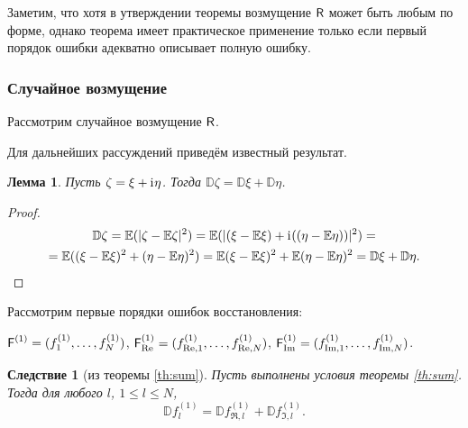 \documentclass[specialist,
               substylefile = spbu.rtx,
               subf,href,colorlinks=true, 12pt]{disser}
\newtheorem*{notice*}{Замечание}
\newtheorem{lemma}{Лемма}
\newtheorem{corollary}{Следствие}
\DeclareMathOperator{\rk}{rk}
\begin{document}
Заметим, что хотя в утверждении теоремы возмущение $\textsf{R}$ может быть любым по форме, однако теорема имеет практическое применение только если первый порядок ошибки адекватно описывает полную ошибку.




\subsubsection{Случайное возмущение}

Рассмотрим случайное возмущение $\textsf{R}$.

Для дальнейших рассуждений приведём известный результат.
\begin{lemma} \label{std:disp}
	Пусть $\zeta = \xi + \mathrm{i}\mkern1mu\eta$. Тогда $\mathbb{D}\zeta = \mathbb{D}\xi + \mathbb{D}\eta$.
\end{lemma}
\begin{proof}
\begin{multline*}
	\mathbb{D}\zeta = \mathbb{E}(|\zeta - \mathbb{E}\zeta|^2) = \mathbb{E}(|(\xi - \mathbb{E}\xi) + \mathrm{i}\mkern1mu((\eta - \mathbb{E}\eta))|^2) = \\
	= \mathbb{E}((\xi - \mathbb{E}\xi)^2 + (\eta - \mathbb{E}\eta)^2)= \mathbb{E}(\xi - \mathbb{E}\xi)^2 + \mathbb{E}(\eta - \mathbb{E}\eta)^2 = \mathbb{D}\xi + \mathbb{D}\eta.
\end{multline*}
\end{proof}

Рассмотрим первые порядки ошибок восстановления:

$\textsf{F}^{(1)} = (f^{(1)}_1, \ldots, f^{(1)}_N)$, $\textsf{F}^{(1)}_{\Re} = (f^{(1)}_{\Re,1}, \ldots, f^{(1)}_{\Re, N})$, $\textsf{F}^{(1)}_{\Im} = (f^{(1)}_{\Im,1}, \ldots, f^{(1)}_{\Im, N})$.


\begin{corollary}[из теоремы {\ref{th:sum}}] \label{st:dispsum}
	Пусть выполнены условия теоремы \ref{th:sum}.
	Тогда для любого $l$, $1\le l \le N$,
	\begin{equation} \label{eq:dispsum}
		\mathbb{D}f^{(1)}_l = \mathbb{D}f^{(1)}_{\Re, l} + \mathbb{D}f^{(1)}_{\Im, l}.	
	\end{equation}
\end{corollary}
\end{document}
